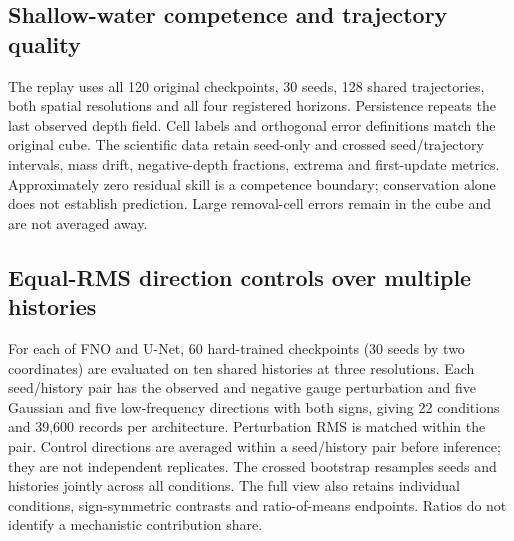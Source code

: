 \documentclass{article}
\begin{document}


\subsection{Shallow-water competence and trajectory quality}
The replay uses all 120 original checkpoints, 30 seeds, 128 shared trajectories, both
spatial resolutions and all four registered horizons. Persistence repeats the last
observed depth field. Cell labels and orthogonal error definitions match the original
cube. The scientific data retain seed-only and crossed seed/trajectory intervals,
mass drift, negative-depth fractions, extrema and first-update metrics. Approximately
zero residual skill is a competence boundary; conservation alone does not establish
prediction. Large removal-cell errors remain in the cube and are not averaged away.



\subsection{Equal-RMS direction controls over multiple histories}
For each of FNO and U-Net, 60 hard-trained checkpoints (30 seeds by two coordinates)
are evaluated on ten shared histories at three resolutions. Each seed/history pair
has the observed and negative gauge perturbation and five Gaussian and five
low-frequency directions with both signs, giving 22 conditions and 39,600 records
per architecture. Perturbation RMS is matched within the pair. Control directions
are averaged within a seed/history pair before inference; they are not independent
replicates. The crossed bootstrap resamples seeds and histories jointly across all
conditions. The full view also retains individual conditions, sign-symmetric contrasts
and ratio-of-means endpoints. Ratios do not identify a mechanistic contribution share.


\end{document}
